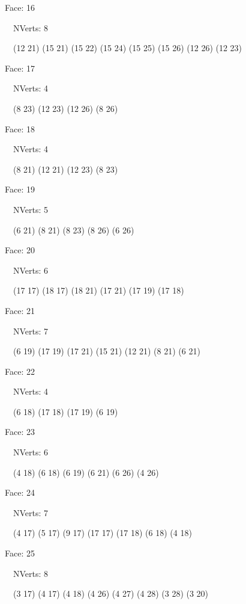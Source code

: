 \documentclass{article}
\begin{document}
{\footnotesize 

Face: 16

\   \    NVerts: 8

 \   \   (12 21) (15 21) (15 22) (15 24) (15 25) (15 26) (12 26) (12 23)}

{\footnotesize 

Face: 17

\   \    NVerts: 4

 \   \   (8 23) (12 23) (12 26) (8 26)}

{\footnotesize 

Face: 18

\   \    NVerts: 4

 \   \   (8 21) (12 21) (12 23) (8 23)}

{\footnotesize 

Face: 19

\   \    NVerts: 5

 \   \   (6 21) (8 21) (8 23) (8 26) (6 26)}

{\footnotesize 

Face: 20

\   \    NVerts: 6

 \   \   (17 17) (18 17) (18 21) (17 21) (17 19) (17 18)}

{\footnotesize 

Face: 21

\   \    NVerts: 7

 \   \   (6 19) (17 19) (17 21) (15 21) (12 21) (8 21) (6 21)}

{\footnotesize 

Face: 22

\   \    NVerts: 4

 \   \   (6 18) (17 18) (17 19) (6 19)}

{\footnotesize 

Face: 23

\   \    NVerts: 6

 \   \   (4 18) (6 18) (6 19) (6 21) (6 26) (4 26)}

{\footnotesize 

Face: 24

\   \    NVerts: 7

 \   \   (4 17) (5 17) (9 17) (17 17) (17 18) (6 18) (4 18)}

{\footnotesize 

Face: 25

\   \    NVerts: 8

 \   \   (3 17) (4 17) (4 18) (4 26) (4 27) (4 28) (3 28) (3 20)}
\end{document}
